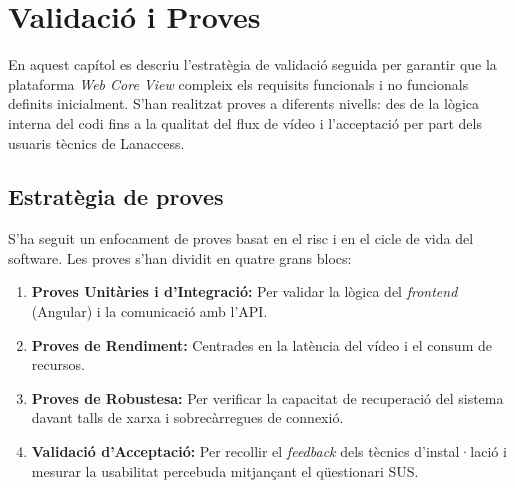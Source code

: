 \chapter{Validació i Proves}
\label{ch:validacio}

En aquest capítol es descriu l'estratègia de validació seguida per garantir que la plataforma \textit{Web Core View} compleix els requisits funcionals i no funcionals definits inicialment. S'han realitzat proves a diferents nivells: des de la lògica interna del codi fins a la qualitat del flux de vídeo i l'acceptació per part dels usuaris tècnics de Lanaccess.

\section{Estratègia de proves}
S'ha seguit un enfocament de proves basat en el risc i en el cicle de vida del software. Les proves s'han dividit en quatre grans blocs:
\begin{enumerate}
    \item \textbf{Proves Unitàries i d'Integració:} Per validar la lògica del \textit{frontend} (Angular) i la comunicació amb l'API.
    \item \textbf{Proves de Rendiment:} Centrades en la latència del vídeo i el consum de recursos.
    \item \textbf{Proves de Robustesa:} Per verificar la capacitat de recuperació del sistema davant talls de xarxa i sobrecàrregues de connexió.
    \item \textbf{Validació d'Acceptació:} Per recollir el \textit{feedback} dels tècnics d'instal·lació i mesurar la usabilitat percebuda mitjançant el qüestionari SUS.
\end{enumerate}

